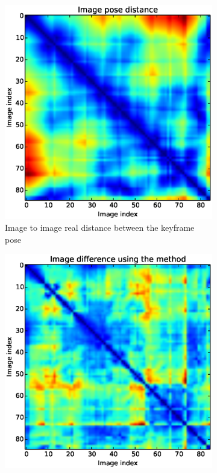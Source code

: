 \begin{figure}
  \begin{subfigure}[b]{0.50\linewidth}
          \includegraphics[width=\linewidth]{img/demo_1_1_CC_real_similarity_matrix.eps}
          \caption{Image to image real distance between the keyframe pose}                
          \label{fig:real_distance_confusion_matrix}
  \end{subfigure}   
  \quad
  \begin{subfigure}[b]{0.50\linewidth}
         \includegraphics[width=\linewidth]{img/demo_1_1_CC_CC_similarity_matrix.eps}

\end{subfigure}
\end{figure}
